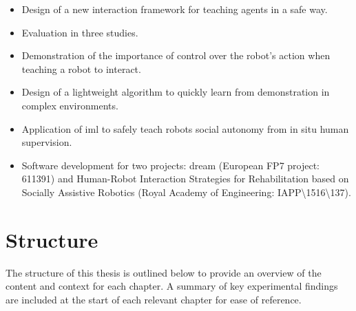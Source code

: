 \begin{itemize}
	\item Design of a new interaction framework for teaching agents in a safe way.
	\item Evaluation in three studies.
	\item Demonstration of the importance of control over the robot's action when teaching a robot to interact.
	\item Design of a lightweight algorithm to quickly learn from demonstration in complex environments.
	\item Application of \gls{iml} to safely teach robots social autonomy from in situ human supervision. 
	\item Software development for two projects: \acrshort{dream} (European FP7 project: 611391) and Human-Robot Interaction Strategies for Rehabilitation based on Socially Assistive Robotics (Royal Academy of Engineering: IAPP\textbackslash1516\textbackslash137).
\end{itemize}

\section{Structure}\label{sec:intro-struct}
The structure of this thesis is outlined below to provide an overview of the content and context for each chapter. A summary of key experimental findings are included at the start of each relevant chapter for ease of reference. 

